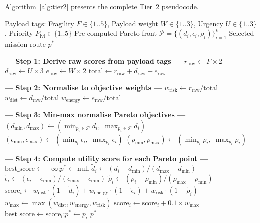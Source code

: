 Algorithm~\ref{alg:tier2} presents the complete Tier~2 pseudocode.

\begin{algorithm}[ht!]
\caption{Payload-Driven Pareto Route Selection (Tier~2)}
\label{alg:tier2}
\begin{algorithmic}[1]
\Require Payload tags: Fragility $F \in \{1..5\}$, Payload weight $W \in \{1..3\}$,
         Urgency $U \in \{1..3\}$, Priority $P_{\text{lvl}} \in \{1..5\}$
\Require Pre-computed Pareto front $\mathcal{P} = \{(d_i, \epsilon_i, \rho_i)\}_{i=1}^{k}$
\Ensure  Selected mission route $p^*$

\Statex \textbf{--- Step 1: Derive raw scores from payload tags ---}
\State $r_{\text{raw}} \gets F \times 2$
\State $d_{\text{raw}} \gets U \times 3$
\State $e_{\text{raw}} \gets W \times 2$
\State $\text{total} \gets r_{\text{raw}} + d_{\text{raw}} + e_{\text{raw}}$

\Statex \textbf{--- Step 2: Normalise to objective weights ---}
\State $w_{\mathrm{risk}}   \gets r_{\text{raw}} / \text{total}$
\State $w_{\mathrm{dist}}   \gets d_{\text{raw}} / \text{total}$
\State $w_{\mathrm{energy}} \gets e_{\text{raw}} / \text{total}$

\Statex \textbf{--- Step 3: Min-max normalise Pareto objectives ---}
\State $(d_{\min}, d_{\max}) \gets (\min_{p_i \in \mathcal{P}} d_i,\; \max_{p_i \in \mathcal{P}} d_i)$
\State $(\epsilon_{\min}, \epsilon_{\max}) \gets (\min_{p_i} \epsilon_i,\; \max_{p_i} \epsilon_i)$
\State $(\rho_{\min}, \rho_{\max}) \gets (\min_{p_i} \rho_i,\; \max_{p_i} \rho_i)$

\Statex \textbf{--- Step 4: Compute utility score for each Pareto point ---}
\State $\text{best\_score} \gets -\infty$;\quad $p^* \gets \text{null}$
  \State $\tilde{d}_i \gets (d_i - d_{\min}) / (d_{\max} - d_{\min})$
  \State $\tilde{\epsilon}_i \gets (\epsilon_i - \epsilon_{\min}) / (\epsilon_{\max} - \epsilon_{\min})$
  \State $\tilde{\rho}_i \gets (\rho_i - \rho_{\min}) / (\rho_{\max} - \rho_{\min})$
  \State $\text{score}_i \gets w_{\mathrm{dist}} \cdot (1 - \tilde{d}_i)
         + w_{\mathrm{energy}} \cdot (1 - \tilde{\epsilon}_i)
         + w_{\mathrm{risk}} \cdot (1 - \tilde{\rho}_i)$
   
    \State $w_{\max} \gets \max(w_{\mathrm{dist}}, w_{\mathrm{energy}}, w_{\mathrm{risk}})$
    \State $\text{score}_i \gets \text{score}_i + 0.1 \times w_{\max}$
  \EndIf
    \State $\text{best\_score} \gets \text{score}_i$;\quad $p^* \gets p_i$
  \EndIf
\EndFor
\State \Return $p^*$
\end{algorithmic}
\end{algorithm}

